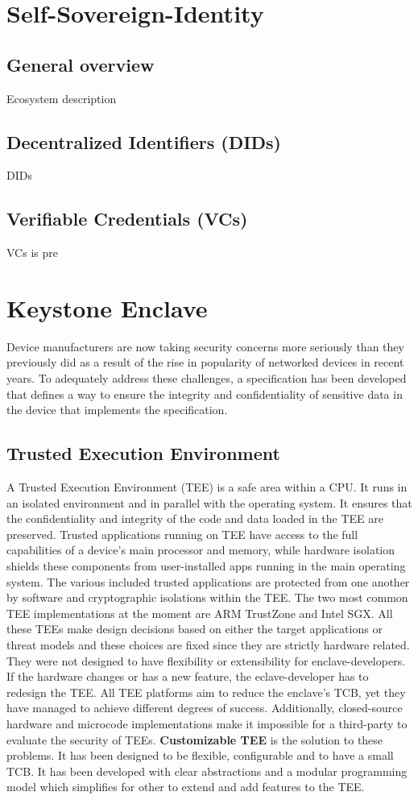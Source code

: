 \section{Self-Sovereign-Identity }
\subsection{General overview}
Ecosystem description
\subsection{Decentralized Identifiers (DIDs)}
DIDs
\subsection{Verifiable Credentials (VCs)}
VCs is pre

\section{Keystone Enclave}
Device manufacturers are now taking security concerns more seriously than they previously did as a result of the rise in popularity of networked devices in recent years.
To adequately address these challenges, a specification has been developed that defines a way to ensure the integrity and confidentiality of sensitive data in the device that implements the specification.
\cite{IntroTEE}
\subsection{Trusted Execution Environment}
A Trusted Execution Environment (TEE) is a safe area within a CPU. It runs in an isolated environment and in parallel with the operating system.
It ensures that the confidentiality and integrity of the code and data loaded in the TEE are preserved. 
Trusted applications running on TEE have access to the full capabilities of a device's main processor and memory, while hardware isolation shields these components from user-installed apps running in the main operating system. The various included trusted applications are protected from one another by software and cryptographic isolations within the TEE.
\cite{IntroTEE}
The two most common TEE implementations at the moment are ARM TrustZone and Intel SGX. All these TEEs make design decisions based on either the target applications or threat models and these choices are fixed since they are strictly hardware related. They were not designed to have flexibility or extensibility for enclave-developers.  If the hardware changes or has a new feature, the eclave-developer has to redesign the TEE.
All TEE platforms aim to reduce the enclave's TCB, yet they have managed to achieve different degrees of success. Additionally, closed-source hardware and microcode implementations make it impossible for a third-party to evaluate the security of TEEs.
\textbf{Customizable TEE} is the solution to these problems. It has been designed to be flexible, configurable and to have a small TCB. It has been developed with clear abstractions and a modular programming model which simplifies for other to extend and add features to the TEE. 
\cite{lee2020keystone} 
